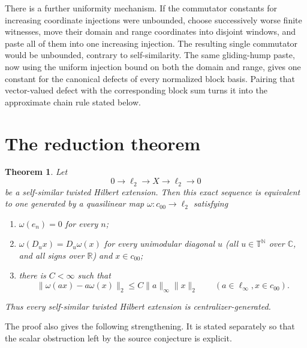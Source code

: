 \documentclass[11pt]{article}
\newtheorem{theorem}{Theorem}
\newcommand{\czz}{c_{00}}
\newcommand{\TT}{\mathbb T}
\newcommand{\Dop}[1]{D_{#1}}
\begin{document}
There is a further uniformity mechanism.  If the commutator constants for
increasing coordinate injections were unbounded, choose successively worse
finite witnesses, move their domain and range coordinates into disjoint
windows, and paste all of them into one increasing injection.  The resulting
single commutator would be unbounded, contrary to self-similarity.  The same
gliding-hump paste, now using the uniform injection bound on both the domain
and range, gives one constant for the canonical defects of every normalized
block basis.  Pairing that vector-valued defect with the corresponding block
sum turns it into the approximate chain rule stated below.

\section*{The reduction theorem}

\begin{theorem}\label{thm:main}
Let
\[
 0\longrightarrow\ell_2\longrightarrow X\longrightarrow\ell_2
 \longrightarrow0
\]
be a self-similar twisted Hilbert extension.  Then this exact sequence is
equivalent to one generated by a quasilinear map
$\omega:\czz\to\ell_2$ satisfying
\begin{enumerate}[label=\textup{(\roman*)}]
\item $\omega(e_n)=0$ for every $n$;
\item $\omega(\Dop u x)=\Dop u\omega(x)$ for every unimodular diagonal
      $u$ (all $u\in\TT^{\mathbb N}$ over $\mathbb C$, and all signs over
      $\mathbb R$) and $x\in\czz$;
\item there is $C<\infty$ such that
\[
 \|\omega(ax)-a\omega(x)\|_2
 \le C\|a\|_\infty\|x\|_2
 \qquad(a\in\ell_\infty,x\in\czz).
\]
\end{enumerate}
Thus every self-similar twisted Hilbert extension is centralizer-generated.
\end{theorem}

The proof also gives the following strengthening.  It is stated separately so
that the scalar obstruction left by the source conjecture is explicit.
\end{document}
